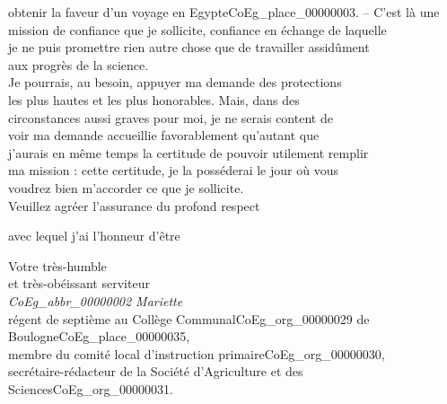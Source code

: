 \documentclass{book}
\begin{document}
obtenir la faveur d’un voyage en Egypte\gls{CoEg_place_00000003}. – C’est là une\\
mission de confiance que je sollicite, confiance en échange de laquelle\\
je ne puis promettre rien autre chose que de travailler assidûment\\
aux progrès de la science.\\
\indent Je pourrais, au besoin, appuyer ma demande des protections\\
les plus hautes et les plus honorables. Mais, dans des\\
circonstances aussi graves pour moi, je ne serais content de\\
voir ma demande accueillie favorablement qu’autant que\\
j’aurais en même temps la certitude de pouvoir utilement remplir\\
ma mission : cette certitude, je la posséderai le jour où vous\\
voudrez bien m’accorder ce que je sollicite.\\
\indent Veuillez agréer l’assurance du profond respect
\begin{center}avec lequel j’ai l’honneur d’être\end{center}
\begin{center}\hspace{5cm}Votre très-humble\\
\hspace{5cm}et très-obéissant serviteur\\
\hspace{5cm}\textit{\gls{CoEg_abbr_00000002} Mariette}\\
\hspace{3,5cm}régent de septième au Collège Communal\gls{CoEg_org_00000029} de Boulogne\gls{CoEg_place_00000035},\\
\hspace{3,5cm}membre du comité local d’instruction primaire\gls{CoEg_org_00000030},\\
\hspace{3,5cm}secrétaire-rédacteur de la Société d’Agriculture et des Sciences\gls{CoEg_org_00000031}.\end{center}


\hypertarget{CoEg_Mariette_1846-05-24}{}
\end{document}
